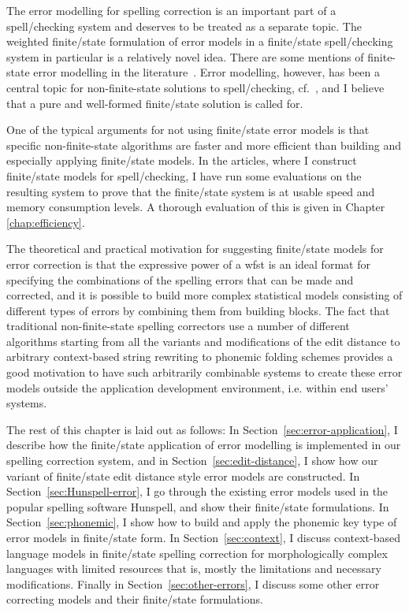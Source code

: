 \documentclass[officiallayout,final]{unihelcompling}
\begin{document}
The error modelling for spelling correction is an important part of a
spell\-/checking system and deserves to be treated as a separate topic.
The weighted finite\-/state formulation of \glspl{error model} in a
finite\-/state spell\-/checking system in particular is a relatively novel
idea. There are some mentions of finite-state error modelling in the
literature~\citep{agirre1992xuxen,vannoord2001extendible,agata2002typographical,mohri2003edit}.
Error modelling, however, has been a central topic for non-finite-state
solutions to spell\-/checking,
cf.~\citet{kukich1992spelling,mitton2009ordering,deorowicz2005correcting}, and
I believe that a pure and well-formed finite\-/state solution is called for.

One of the typical arguments for not using finite\-/state error models is that
specific non-finite-state algorithms are faster and more efficient than
building and especially applying finite\-/state models. In the articles,
where I construct finite\-/state models for spell\-/checking, I have run some
evaluations on the resulting system to prove that the finite\-/state system is
at usable speed and memory consumption levels. A thorough evaluation of this
is given in Chapter \ref{chap:efficiency}.

The theoretical and practical motivation for suggesting finite\-/state models
for error correction is that the expressive power of a \gls{wfst} is an
ideal format for specifying the combinations of the spelling errors that can be
made and corrected, and it is possible to build more complex statistical models
consisting of different types of errors by combining them from building blocks.
The fact that traditional non-finite-state spelling correctors use a number of
different algorithms starting from all the variants and modifications of the
edit distance to arbitrary context-based string rewriting to phonemic folding
schemes provides a good motivation to have such arbitrarily combinable systems
to create these error models outside the application development environment,
i.e. within end users' systems.

The rest of this chapter is laid out as follows: In
Section~\ref{sec:error-application}, I describe how the finite\-/state
application of error modelling is implemented in our spelling correction
system, and in Section~\ref{sec:edit-distance}, I show how our variant of
finite\-/state edit distance style error models are constructed.  In
Section~\ref{sec:Hunspell-error}, I go through the existing error models used in
the popular spelling software Hunspell, and show their finite\-/state
formulations. In Section~\ref{sec:phonemic}, I show how to build and apply the
phonemic key type of error models in finite\-/state form.  In
Section~\ref{sec:context}, I discuss context-based language models in
finite\-/state spelling correction for morphologically complex languages with
limited resources that is, mostly the limitations and necessary modifications.
Finally in Section~\ref{sec:other-errors}, I discuss some other error correcting
models and their finite\-/state formulations.
\end{document}
